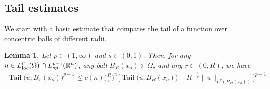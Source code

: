\documentclass[10pt,letterpaper]{amsart}
\newtheorem{lemma}[theorem]{Lemma}
\newtheorem{corollary}[theorem]{Corollary}
\theoremstyle{definition}
\numberwithin{theorem}{section}
\numberwithin{equation}{section}
\newcommand{\1}{\ensuremath{\mathds{1}}}
\DeclareMathOperator{\Tail}{Tail}
\numberwithin{equation}{section}
\begin{document}









\subsection{Tail estimates}

We start with a basic estimate that compares the tail of a function over concentric balls of different radii.

\begin{lemma}\label{lem:t}
Let $p\in(1,\infty)$ and $s\in(0,1)$. 
Then, for any $u\in L^p_{\rm loc}(\Omega)\cap L^{p-1}_{sp}(\mathbb{R}^n)$, any ball $B_{R}(x_o)\Subset\Omega$, and any $r\in(0,R)$, we have
\begin{align*}
    \Tail \big(u; B_r(x_o)\big)^{p-1}
    \le 
     c(n)\Big(\frac{R}{r}\Big)^n
    \Big[
    \Tail \big(u, B_R(x_o)\big)
    + 
    R^{-\frac{n}{p}}\| u\|_{L^p(B_R(x_o))}
    \Big]^{p-1}
\end{align*}
\end{lemma}
\end{document}
